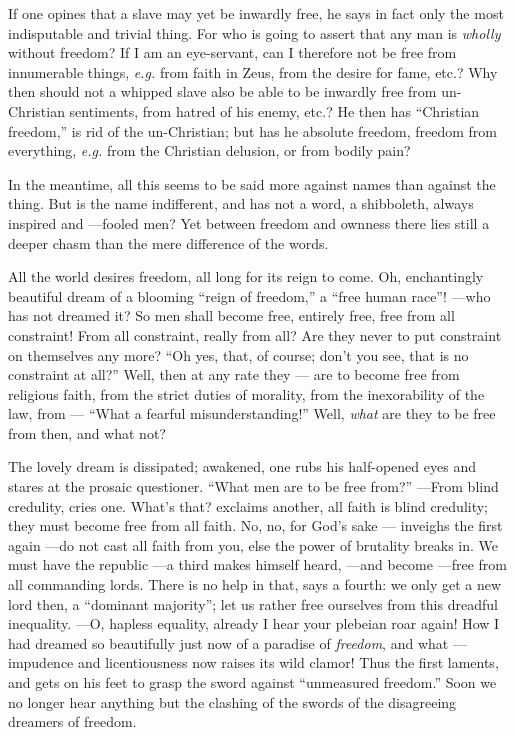 If one opines that a slave may yet be inwardly free, he says in fact only the 
most indisputable and trivial thing. For who is going to assert that any man 
is \textit{wholly} without freedom? If I am an eye-servant, can I therefore 
not be free from innumerable things, \textit{e.g.} from faith in Zeus, from 
the desire for fame, etc.? Why then should not a whipped slave also be able to 
be inwardly free from un-Christian sentiments, from hatred of his enemy, etc.? 
He then has ``Christian freedom,'' is rid of the un-Christian; but has he 
absolute freedom, freedom from everything, \textit{e.g.} from the Christian 
delusion, or from bodily pain?

In the meantime, all this seems to be said more against names than against the 
thing. But is the name indifferent, and has not a word, a shibboleth, always 
inspired and ---fooled men? Yet between freedom and ownness there lies still a 
deeper chasm than the mere difference of the words.

All the world desires freedom, all long for its reign to come. Oh, 
enchantingly beautiful dream of a blooming ``reign of freedom,'' a ``free 
human race''! ---who has not dreamed it? So men shall become free, entirely 
free, free from all constraint! From all constraint, really from all? Are they 
never to put constraint on themselves any more? ``Oh yes, that, of course; 
don't you see, that is no constraint at all?'' Well, then at any rate they --- 
are to become free from religious faith, from the strict duties of morality, 
from the inexorability of the law, from --- ``What a fearful 
misunderstanding!'' Well, \textit{what} are they to be free from then, and 
what not?

The lovely dream is dissipated; awakened, one rubs his half-opened eyes and 
stares at the prosaic questioner. ``What men are to be free from?'' ---From 
blind credulity, cries one. What's that? exclaims another, all faith is blind 
credulity; they must become free from all faith. No, no, for God's sake --- 
inveighs the first again ---do not cast all faith from you, else the power of 
brutality breaks in. We must have the republic ---a third makes himself heard, ---and become ---free from all commanding lords. There is no help in that, 
says a fourth: we only get a new lord then, a ``dominant majority''; let us 
rather free ourselves from this dreadful inequality. ---O, hapless equality, 
already I hear your plebeian roar again! How I had dreamed so beautifully just 
now of a paradise of \textit{freedom}, and what ---impudence and 
licentiousness now raises its wild clamor! Thus the first laments, and gets on 
his feet to grasp the sword against ``unmeasured freedom.'' Soon we no 
longer hear anything but the clashing of the swords of the disagreeing 
dreamers of freedom.

